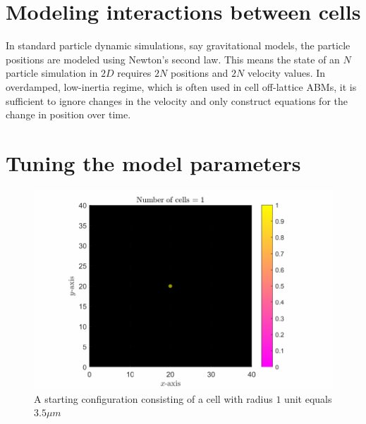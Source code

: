 \section{Modeling interactions between cells}
In standard particle dynamic simulations, say gravitational models, the particle positions are modeled using Newton's second law. This means the state of an $N$ particle simulation in $2D$ requires $2N$ positions and $2N$ velocity values. In overdamped, low-inertia regime, which is often used in cell off-lattice ABMs, it is sufficient to ignore changes in the velocity and only construct equations for the change in position over time. 

\section{Tuning the model parameters}

\begin{figure}[h]
\centering
\includegraphics[width=1\textwidth]{chapter1/figures/ColonySimulationDemo_N_1.pdf}
\caption{A starting configuration consisting of a cell with radius $1$ unit equals $3.5 \mu m$}
\label{fig:ColonySimulationStartingCell}
\end{figure}
\filbreak


